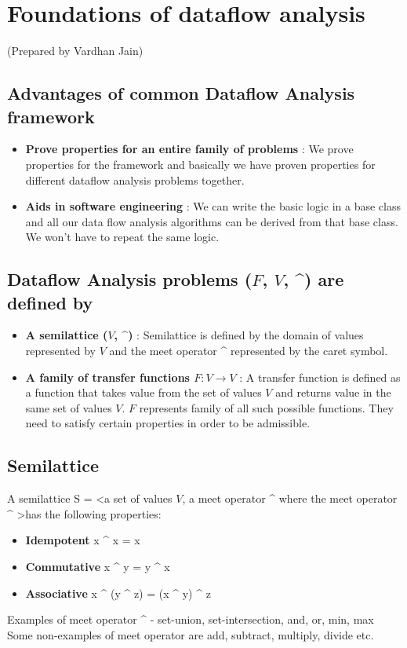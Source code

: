 \section {Foundations of dataflow analysis}
\setlength{\parindent}{0pt}
(Prepared by Vardhan Jain)

\vspace{0.3cm}

\subsection{Advantages of common Dataflow Analysis framework}
\begin{itemize}
    \item \textbf{Prove properties for an entire family of problems} : We prove properties for the framework
    and basically we have proven properties for different dataflow analysis problems together.
    \item \textbf{Aids in software engineering} : We can write the basic logic in a base class and all our data 
    flow analysis algorithms can be derived from that base class. We won't have to repeat the same logic.
\end{itemize}

\subsection{Dataflow Analysis problems \textbf{($F$, $V$, \^{})} are defined by}
\begin{itemize}
    \item \textbf{A semilattice ($V$, \^{})} : Semilattice is defined by the domain of values represented by $V$ and
    the meet operator \^{} represented by the caret symbol.
    \item \textbf{A family of transfer functions $F:V\rightarrow V$} : A transfer function is defined as a function that takes value 
    from the set of values $V$ and returns value in the same set of values $V$. $F$ represents family of all such possible functions.
    They need to satisfy certain properties in order to be admissible.
\end{itemize}
\subsection{Semilattice}
A semilattice S = \textless a set of values $V$, a meet operator \^{} where the meet operator \^{} \textgreater  has the following properties:
\begin{itemize}
    \item \textbf{Idempotent} x \^{} x = x
    \item \textbf{Commutative} x \^{} y = y \^{} x
    \item \textbf{Associative}  x \^{} (y \^{} z) = (x \^{} y) \^{} z
\end{itemize}
Examples of meet operator \^{} - set-union, set-intersection, and, or, min, max \\
Some non-examples of meet operator are add, subtract, multiply, divide etc.

